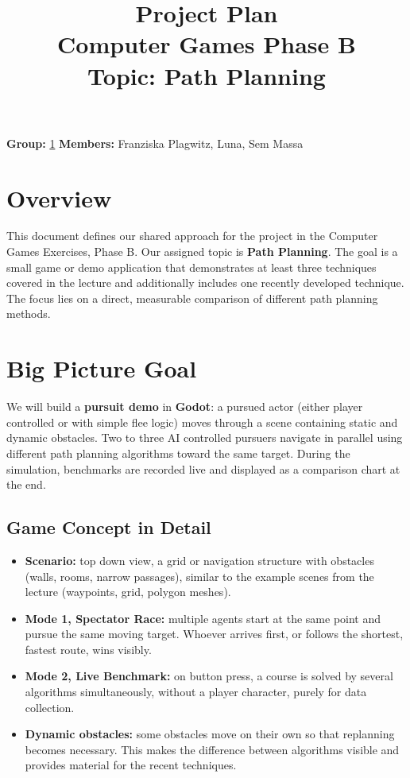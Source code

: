 \documentclass[11pt,a4paper]{article}
\title{\Huge\textbf{Project Plan}\\[0.3em]
\Large Computer Games \textendash{} Phase B\\[0.2em]
\large Topic: Path Planning}
\author{}
\date{}
\begin{document}
\maketitle
\thispagestyle{fancy}

\noindent
\textbf{Group:} \underline{1} \qquad
\textbf{Members:} Franziska Plagwitz, Luna, Sem Massa

\vspace{1em}

\section*{Overview}

This document defines our shared approach for the project in the Computer
Games Exercises, Phase B. Our assigned topic is \textbf{Path Planning}. The
goal is a small game or demo application that demonstrates at least three
techniques covered in the lecture and additionally includes one recently
developed technique. The focus lies on a direct, measurable comparison of
different path planning methods.

\section{Big Picture Goal}

We will build a \textbf{pursuit demo} in \textbf{Godot}: a pursued actor
(either player controlled or with simple flee logic) moves through a scene
containing static and dynamic obstacles. Two to three AI controlled
pursuers navigate in parallel using different path planning algorithms
toward the same target. During the simulation, benchmarks are recorded
live and displayed as a comparison chart at the end.


\subsection{Game Concept in Detail}

\begin{itemize}[leftmargin=1.2em]
  \item \textbf{Scenario:} top down view, a grid or navigation structure
  with obstacles (walls, rooms, narrow passages), similar to the example
  scenes from the lecture (waypoints, grid, polygon meshes).
  \item \textbf{Mode 1, Spectator Race:} multiple agents start at the same
  point and pursue the same moving target. Whoever arrives first, or
  follows the shortest, fastest route, wins visibly.
  \item \textbf{Mode 2, Live Benchmark:} on button press, a course is
  solved by several algorithms simultaneously, without a player character,
  purely for data collection.
  \item \textbf{Dynamic obstacles:} some obstacles move on
  their own so that replanning becomes necessary. This makes the
  difference between algorithms visible and provides material for the
  recent techniques.
\end{itemize}
\end{document}
